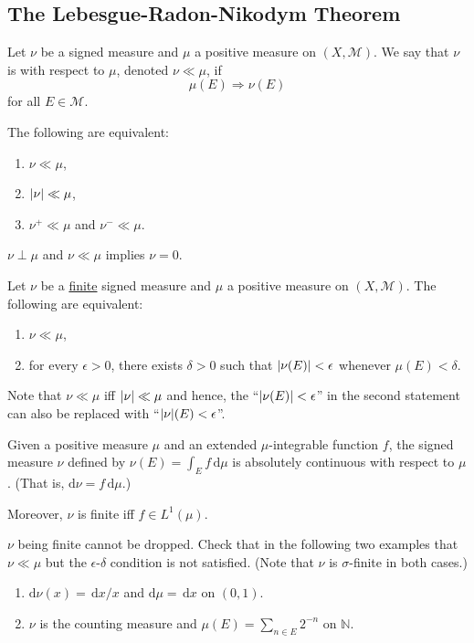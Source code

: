 \documentclass[12pt]{article}	%
\begin{document}
\subsection{The Lebesgue-Radon-Nikodym Theorem}

\begin{defn}
	Let $\nu$ be a signed measure and $\mu$ a positive measure on $(X, \mathcal{M})$. We say that $\nu$ is  with respect to $\mu$, denoted $\nu \ll \mu$, if
	\begin{equation*} 
		\mu(E) \Rightarrow \nu(E)
	\end{equation*}
	for all $E \in \mathcal{M}$.
\end{defn}

\begin{exe}
	The following are equivalent:
	\begin{enumerate}
		\item $\nu \ll \mu$,
		\item ${\left\lvert \nu \right\lvert} \ll \mu$,
		\item $\nu^{+} \ll \mu$ and $\nu^{-} \ll \mu$.
	\end{enumerate}
\end{exe}
\begin{exe}
	$\nu \perp \mu$ and $\nu \ll \mu$ implies $\nu = 0$.
\end{exe}

\begin{thm}
	Let $\nu$ be a \underline{finite} signed measure and $\mu$ a positive measure on $(X, \mathcal{M})$. The following are equivalent:
	\begin{enumerate}
	 	\item $\nu \ll \mu$,
	 	\item for every $\epsilon > 0$, there exists $\delta > 0$ such that ${\left\lvert \nu(E) \right\lvert} < \epsilon$ whenever $\mu(E) < \delta$.
	 \end{enumerate} 
\end{thm}
Note that $\nu \ll \mu$ iff ${\left\lvert \nu \right\lvert} \ll \mu$ and hence, the ``${\left\lvert \nu(E) \right\lvert} < \epsilon$'' in the second statement can also be replaced with ``${\left\lvert \nu \right\lvert}(E) < \epsilon$''.

\begin{rem}
	Given a positive measure $\mu$ and an extended $\mu$-integrable function $f$, the signed measure $\nu$ defined by $\nu(E) = \int_{E} f \,{\mathrm{d}}\mu$ is absolutely continuous with respect to $\mu$. (That is, ${\mathrm d}\nu = f \,{\mathrm d}\mu$.)

	Moreover, $\nu$ is finite iff $f \in L^{1}(\mu)$.
\end{rem}
\begin{exe}
	$\nu$ being finite cannot be dropped. Check that in the following two examples that $\nu \ll \mu$ but the $\epsilon$-$\delta$ condition is not satisfied. (Note that $\nu$ is $\sigma$-finite in both cases.)
	\begin{enumerate}
		\item ${\mathrm d} \nu(x) = \,{\mathrm d}x/x$ and ${\mathrm d}\mu = \,{\mathrm d} x$ on $(0, 1)$.
		\item $\nu$ is the counting measure and $\mu(E) = \sum_{n \in E} 2^{-n}$ on $\mathbb{N}$.
	\end{enumerate}
\end{exe}
\end{document}

